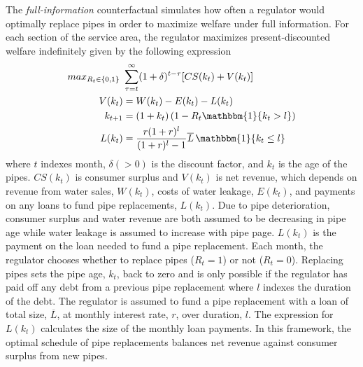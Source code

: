 \documentclass[12pt,table]{article}
\begin{document}



The \textit{full-information} counterfactual simulates how often a regulator would optimally replace pipes in order to maximize welfare under full information.  For each section of the service area, the regulator maximizes present-discounted welfare indefinitely given by the following expression
\begin{align*}
max_{R_t\in\{0,1\}} \,\, &\sum_{\tau = t}^{\infty} (1+\delta)^{t-\tau} [CS(k_{t}) + V(k_{t})]  \\
V(k_{t}) &= W(k_{t}) - E(k_{t}) - L(k_{t})\\ 
k_{t+1} &=  (1 + k_t) \, (1-R_t \mathbbm{1} \{ k_{t}> l\}) \\
L(k_t) &= \frac{r(1+r)^{l} }{(1+r)^{l} -1 }\overline{L} \, \mathbbm{1} \{ k_{t}\leq l \}
\end{align*}
where $t$ indexes month, $\delta(>0)$ is the discount factor, and $k_t$ is the age of the pipes.  $CS(k_{t})$ is consumer surplus and $V(k_t)$ is net revenue, which depends on revenue from water sales, $W(k_{t})$, costs of water leakage, $E(k_{t})$, and payments on any loans to fund pipe replacements, $L(k_t)$.  Due to pipe deterioration, consumer surplus and water revenue are both assumed to be decreasing in pipe age while water leakage is assumed to increase with pipe page.  $L(k_{t})$ is the payment on the loan needed to fund a pipe replacement.  Each month, the regulator chooses whether to replace pipes ($R_t = 1$) or not ($R_t = 0$).  Replacing pipes sets the pipe age, $k_t$, back to zero and is only possible if the regulator has paid off any debt from a previous pipe replacement where $l$ indexes the duration of the debt.  The regulator is assumed to fund a pipe replacement with a loan of total size, $\overline{L}$, at monthly interest rate, $r$, over duration, $l$.  The expression for $L(k_t)$ calculates the size of the monthly loan payments.  In this framework, the optimal schedule of pipe replacements balances net revenue against consumer surplus from new pipes.
\end{document}
